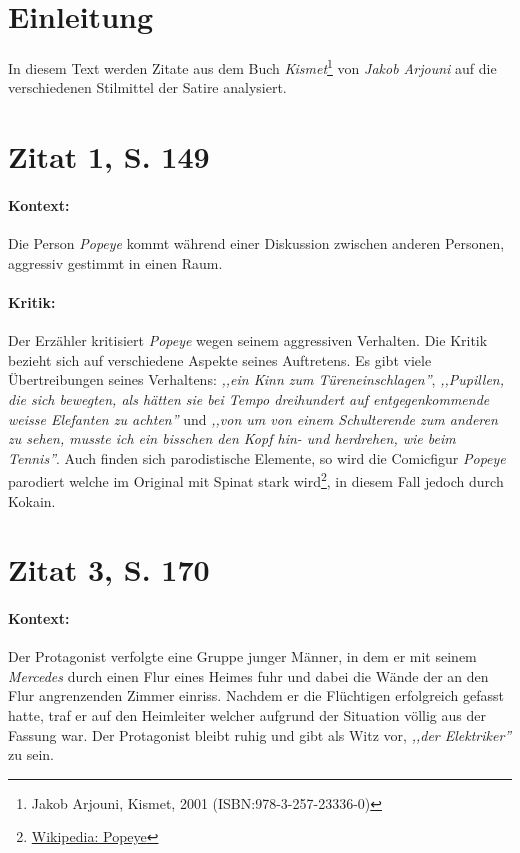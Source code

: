 \documentclass[12pt,twoside,a4paper,twocolumn]{article}
\title{\titleText}
\author{\authorText}
\date{\dateText}
\begin{document}
	\maketitle
	\tableofcontents
	
	\section{Einleitung}
	
	In diesem Text werden Zitate aus dem Buch \textit{Kismet}\footnote{Jakob Arjouni, Kismet, 2001 (ISBN:978-3-257-23336-0)} von \textit{Jakob Arjouni} auf die verschiedenen Stilmittel der Satire analysiert.
	
	\section{Zitat 1, S. 149}
	
	\paragraph{Kontext:} Die Person \textit{Popeye} kommt während einer Diskussion zwischen anderen Personen, aggressiv gestimmt in einen Raum.
	
	\paragraph{Kritik:} Der Erzähler kritisiert \textit{Popeye} wegen seinem aggressiven Verhalten. Die Kritik bezieht sich auf verschiedene Aspekte seines Auftretens. Es gibt viele Übertreibungen seines Verhaltens: \textit{,,ein Kinn zum Türeneinschlagen''}, \textit{,,Pupillen, die sich bewegten, als hätten sie bei Tempo dreihundert  auf entgegenkommende weisse Elefanten zu achten''} und \textit{,,von um von einem Schulterende zum anderen zu sehen, musste ich ein bisschen den Kopf hin- und herdrehen, wie beim Tennis''}. Auch finden sich parodistische Elemente, so wird die Comicfigur \textit{Popeye} parodiert welche im Original mit Spinat stark wird\footnote{\href{https://de.wikipedia.org/wiki/Popeye}{Wikipedia: Popeye}}, in diesem Fall jedoch durch Kokain.
	
	
	\section{Zitat 3, S. 170}
	
	\paragraph{Kontext:} Der Protagonist verfolgte eine Gruppe junger Männer, in dem er mit seinem \textit{Mercedes} durch einen Flur eines Heimes fuhr und dabei die Wände der an den Flur angrenzenden Zimmer einriss. Nachdem er die Flüchtigen erfolgreich gefasst hatte, traf er auf den Heimleiter welcher aufgrund der Situation völlig aus der Fassung war. Der Protagonist bleibt ruhig und gibt als Witz vor, \textit{,,der Elektriker''} zu sein.
	
\end{document}
